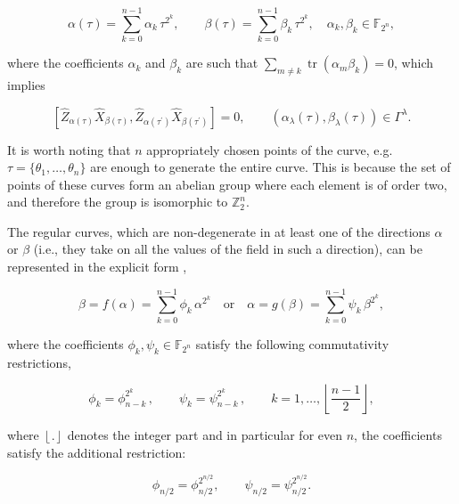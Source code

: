 \documentclass[quantumrep,article,submit,pdftex,moreauthors]{Definitions/mdpi}
\DeclareMathOperator{\tr}{tr}
\begin{document}
\begin{equation}
  \alpha (\tau)
  = \sum_{k=0}^{n-1}\alpha_{k}\,\tau^{2^{k}}, \qquad \beta(\tau)
  = \sum_{k=0}^{n-1}\beta_{k} \, \tau^{2^{k}},
  \quad \alpha_{k},\beta_{k}\in \mathbb{F}_{2^{n}},
  \label{curve1a}
\end{equation}

where the coefficients $\alpha_k$ and $\beta_k$ are such that $\sum_{m \neq k}
\tr(\alpha_{m}\beta_{k})=0$, which implies

\begin{equation}
  \left[
    \hat{Z}_{\alpha(\tau)}\hat{X}_{\beta(\tau)},
    \hat{Z}_{\alpha(\tau^{\prime})}\hat{X}_{\beta(\tau^{\prime})}
  \right] = 0,
  \qquad \left( \alpha_{\lambda}(\tau),\beta_{\lambda}(\tau) \right)
  \in \Gamma^{\lambda }.
  \label{stab}
\end{equation}

It is worth noting that $n$ appropriately chosen points of the curve, e.g.
$\tau=\{\theta_{1},\ldots,\theta_{n}\}$ are enough to generate the entire curve.
This is because the set of points of these curves form an abelian group where
each element is of order two, and therefore the group is isomorphic to
$\mathbb{Z}_{2}^n$.

The regular curves, which are non-degenerate in at least one of the directions
$\alpha$ or $\beta$ (i.e., they take on all the values of the field in such a
direction), can be represented in the explicit form \cite{GS2},

\begin{equation}
  \beta = f(\alpha)
  = \sum_{k=0}^{n-1} \phi_{k} \, \alpha^{2^{k}}
  \quad \text{or} \quad
  \alpha = g(\beta) = \sum_{k=0}^{n-1} \psi_{k}\,\beta^{2^{k}},
  \label{RC}
\end{equation}

where the coefficients $\phi_{k},\psi_{k} \in \mathbb{F}_{2^{n}}$ satisfy the
following commutativity restrictions,

\begin{equation}
  \phi_{k} = \phi_{n-k}^{2^{k}}\,,
  \qquad \psi_{k} = \psi_{n-k}^{2^{k}}\,,
  \qquad k=1,\ldots, \left\lfloor \frac{n-1}{2}\right\rfloor,
  \label{Acc}
\end{equation}

where $\left\lfloor . \right\rfloor$ denotes the integer part and in particular
for even $n$, the coefficients satisfy the additional restriction: 

\begin{equation}
  \phi_{n/2} = \phi_{n/2}^{2^{n/2}},
  \qquad \psi_{n/2} = \psi_{n/2}^{2^{n/2}}.
\end{equation}
\end{document}
